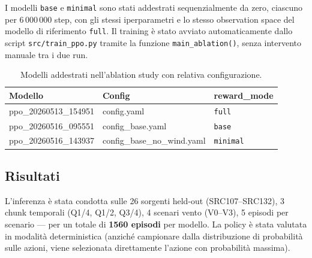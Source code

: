 \documentclass[12pt, a4paper]{article}
\begin{document}
I modelli \texttt{base} e \texttt{minimal} sono stati addestrati
sequenzialmente da zero, ciascuno per 6\,000\,000 step, con gli stessi
iperparametri e lo stesso observation space del modello di riferimento \texttt{full}.
Il training \`e stato avviato automaticamente dallo script \texttt{src/train\_ppo.py}
tramite la funzione \texttt{main\_ablation()}, senza intervento manuale tra i due run.

\begin{table}[htbp]
\centering
\small
\begin{tabular}{L{4.2cm} C{3.8cm} C{4cm}}
\toprule
\textbf{Modello} & \textbf{Config} & \textbf{reward\_mode} \\
\midrule
ppo\_20260513\_154951 & config.yaml & \texttt{full} \\
ppo\_20260516\_095551 & config\_base.yaml & \texttt{base} \\
ppo\_20260516\_143937 & config\_base\_no\_wind.yaml & \texttt{minimal} \\
\bottomrule
\end{tabular}
\caption{Modelli addestrati nell'ablation study con relativa configurazione.}
\end{table}

\subsection{Risultati}

L'inferenza \`e stata condotta sulle 26 sorgenti held-out (SRC107--SRC132),
3 chunk temporali (Q1/4, Q1/2, Q3/4), 4 scenari vento (V0--V3),
5 episodi per scenario --- per un totale di \textbf{1560 episodi} per modello.
La policy \`e stata valutata in modalit\`a deterministica
(anzich\'e campionare dalla distribuzione di probabilit\`a sulle azioni,
viene selezionata direttamente l'azione con probabilit\`a massima).
\end{document}

